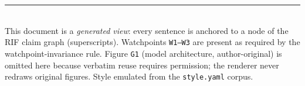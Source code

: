 \documentclass[10pt,twocolumn]{article}
\begin{document}
\vspace{6pt}
\noindent\rule{\columnwidth}{0.4pt}\\
{\scriptsize This document is a \emph{generated view}: every sentence is anchored to a node of the RIF claim graph (superscripts). Watchpoints \texttt{W1--W3} are present as required by the watchpoint-invariance rule. Figure \texttt{G1} (model architecture, author-original) is omitted here because verbatim reuse requires permission; the renderer never redraws original figures. Style emulated from the \texttt{style.yaml} corpus.}
\end{document}
